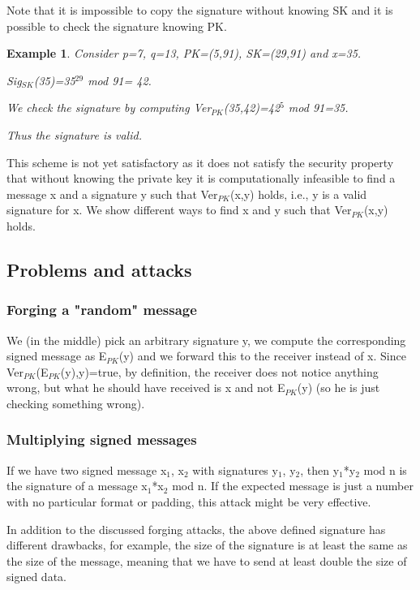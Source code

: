 \documentclass[a4paper, 12pt]{report}
\newtheorem{example}{\textbf{Example}}
\begin{document}
Note that it is impossible to copy the signature without knowing SK and it is possible to check the signature knowing PK.

\begin{example}
	Consider p=7, q=13, PK=(5,91), SK=(29,91) and x=35.
	
	Sig$_{SK}$(35)=35$^{29}$ mod 91= 42.
	
	We check the signature by computing Ver$_{PK}$(35,42)=42$^{5}$ mod 91=35.
	
	Thus the signature is valid.
\end{example}

This scheme is not yet satisfactory as it does not satisfy the security property that without knowing the private key it is computationally infeasible to find a message x and a signature y such that Ver$_{PK}$(x,y) holds, i.e., y is a valid signature for x. We show different ways to find x and y such that Ver$_{PK}$(x,y) holds.

\subsection*{Problems and attacks}
\subsubsection{Forging a "random" message}
We (in the middle) pick an arbitrary signature y, we compute the corresponding signed message as E$_{PK}$(y) and we forward this to the receiver instead of x. Since Ver$_{PK}$(E$_{PK}$(y),y)=true, by definition, the receiver does not notice anything wrong, but what he should have received is x and not E$_{PK}$(y) (so he is just checking something wrong).

\subsubsection{Multiplying signed messages}
If we have two signed message x$_1$, x$_2$ with signatures y$_1$, y$_2$, then y$_1$*y$_2$ mod n is the signature of a message x$_1$*x$_2$ mod n. If the expected message is just a number with no particular format or padding, this attack might be very effective.

In addition to the discussed forging attacks, the above defined signature has different drawbacks, for example, the size of the signature is at least the same as the size of the message, meaning that we have to send at least double the size of signed data.
\end{document}
